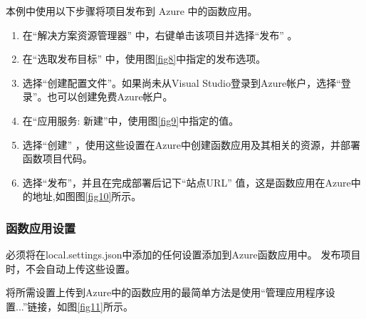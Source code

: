本例中使用以下步骤将项目发布到 Azure 中的函数应用。
\begin{enumerate}
	\item 在“解决方案资源管理器” 中，右键单击该项目并选择“发布” 。
	\item 在“选取发布目标” 中，使用图\ref{fig8}中指定的发布选项。
	\item 选择“创建配置文件”。如果尚未从Visual Studio登录到Azure帐户，选择“登录”。也可以创建免费Azure帐户。
	\item 在“应用服务: 新建”中，使用图\ref{fig9}中指定的值。
	\item 选择“创建” ，使用这些设置在Azure中创建函数应用及其相关的资源，并部署函数项目代码。
	\item 选择“发布”，并且在完成部署后记下“站点URL” 值，这是函数应用在Azure中的地址,如图图\ref{fig10}所示。
\end{enumerate}


\subsubsection{函数应用设置} 
必须将在local.settings.json中添加的任何设置添加到Azure函数应用中。 发布项目时，不会自动上传这些设置。

将所需设置上传到Azure中的函数应用的最简单方法是使用“管理应用程序设置...”链接，如图\ref{fig11}所示。

